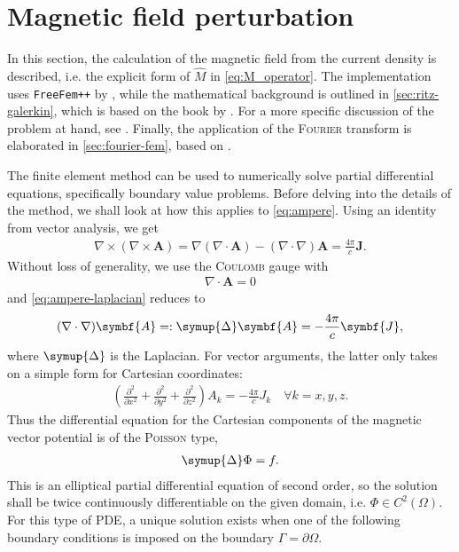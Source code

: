 \documentclass[a4paper, twoside, 10pt, english]{article}
\numberwithin{equation}{section}
\let\vec\symbf
\newcommand*\grad{\ensuremath{\nabla}}
\newcommand*\divg{\ensuremath{\nabla \cdot}}
\newcommand*\curl{\ensuremath{\nabla \times}}
\begin{document}
\clearpage
\section{Magnetic field perturbation}
\label{sec:compute_Bn}

In this section, the calculation of the magnetic field from the current density is described, i.e. the explicit form of $\hat{M}$ in \cref{eq:M_operator}. The implementation uses \texttt{FreeFem++} by \textcite{Hecht12}, while the mathematical background is outlined in \cref{sec:ritz-galerkin}, which is based on the book by \textcite{Jin02}. For a more specific discussion of the problem at hand, see \cite{Seeber18}. Finally, the application of the \textsc{Fourier} transform is elaborated in \cref{sec:fourier-fem}, based on \cite{Albert19}.

The finite element method can be used to numerically solve partial differential equations, specifically boundary value problems. Before delving into the details of the method, we shall look at how this applies to \cref{eq:ampere}. Using an identity from vector analysis, we get
\begin{gather}
  \curl (\curl \vec{A}) = \grad (\divg \vec{A}) - (\nabla \cdot \nabla) \vec{A} = \frac{4 \pi}{c} \vec{J}. \label{eq:ampere-laplacian}
\end{gather}
Without loss of generality, we use the \textsc{Coulomb} gauge with
\begin{gather}
  \divg \vec{A} = 0
\end{gather}
and \cref{eq:ampere-laplacian} reduces to
\begin{gather}
  (\nabla \cdot \nabla) \vec{A} =: \symup{\Delta} \vec{A} = -\frac{4 \pi}{c} \vec{J},
\end{gather}
where $\symup{\Delta}$ is the Laplacian. For vector arguments, the latter only takes on a simple form for Cartesian coordinates:
\begin{gather}
  \left ( \frac{\partial^{2}}{\partial x^{2}} + \frac{\partial^{2}}{\partial y^{2}} + \frac{\partial^{2}}{\partial z^{2}} \right ) A_{k} = -\frac{4 \pi}{c} J_{k} \quad \forall k = x, y, z.
\end{gather}
Thus the differential equation for the Cartesian components of the magnetic vector potential is of the \textsc{Poisson} type,
\begin{gather}
  \symup{\Delta} \Phi = f.
\end{gather}
This is an elliptical partial differential equation of second order, so the solution shall be twice continuously differentiable on the given domain, i.e. $\Phi \in C^{2} (\Omega)$. For this type of PDE, a unique solution exists when one of the following boundary conditions is imposed on the boundary $\Gamma = \partial \Omega$.
\end{document}
